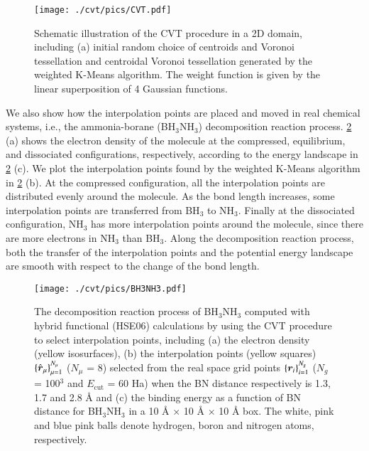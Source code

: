 \begin{figure}[htbp]
  \begin{center}
    \texttt{[image: ./cvt/pics/CVT.pdf]}
  \end{center}
  \caption{Schematic illustration of the CVT procedure in a 2D domain, including
  (a) initial random choice of centroids and Voronoi tessellation and centroidal
  Voronoi tessellation generated by the weighted K-Means algorithm. The weight
  function is given by  the linear superposition of 4 Gaussian functions.}
  \label{fig:CVT}
\end{figure}

We also show how the interpolation points are placed and moved in real chemical
systems, i.e., the ammonia\hyp{}borane (BH$_3$NH$_3$) decomposition reaction
process. \cref{fig:BH3NH3} (a) shows the electron density of the molecule
at the compressed, equilibrium, and dissociated configurations, respectively,
according to the energy landscape in \cref{fig:BH3NH3} (c). We plot the
interpolation points found by the weighted K\hyp{}Means algorithm in 
\cref{fig:BH3NH3} (b). At the compressed configuration, all the interpolation
points are distributed evenly around the molecule. As the bond length increases,
some interpolation points are transferred from BH$_3$ to NH$_3$. Finally at the
dissociated configuration, NH$_3$ has more interpolation points around the
molecule, since there are more electrons in NH$_3$ than BH$_3$. Along the
decomposition reaction process, both the transfer of the interpolation points
and the potential energy landscape are smooth with respect to the change of the
bond length.

\begin{figure}[htbp]
  \begin{center}
    \texttt{[image: ./cvt/pics/BH3NH3.pdf]}
  \end{center}
  \caption{The decomposition reaction process of BH$_3$NH$_3$ computed with
  hybrid functional (HSE06) calculations by using the CVT procedure to select
  interpolation points, including (a) the electron density (yellow isosurfaces),
  (b) the interpolation points (yellow squares) $\{\smash{\hat{\bm{r}}}_\mu\}_{\mu=1}^{N_
  {\mu}}$ ($N_{\mu}$ = 8) selected from the real space grid points $\{\bm{r}_{i}\}_
  {i=1}^{N_{g}}$ ($N_{g}$ = 100$^3$ and $E_{\text{cut}}$ = 60 Ha) when the BN
  distance respectively is 1.3, 1.7 and 2.8 {\AA} and (c) the binding energy as
  a function of BN distance for BH$_3$NH$_3$ in a 10 {\AA} $\times$ 10 {\AA}
  $\times$ 10 {\AA} box. The white, pink and blue pink balls denote hydrogen,
  boron and nitrogen atoms, respectively.}
  \label{fig:BH3NH3}
\end{figure}